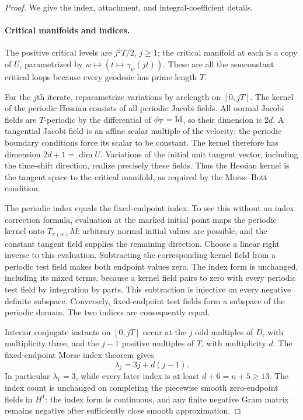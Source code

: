 \begin{proof}
We give the index, attachment, and integral-coefficient details.

\paragraph{Critical manifolds and indices.}
The positive critical levels are $j^2T/2$, $j\ge1$; the critical
manifold at each is a copy of $U$, parametrized by
$w\mapsto(t\mapsto\gamma_w(jt))$.  These are all the nonconstant
critical loops because every geodesic has prime length $T$.

For the $j$th iterate, reparametrize variations by arclength on
$[0,jT]$.  The kernel of the periodic Hessian consists of all
periodic Jacobi fields.  All normal Jacobi fields are $T$-periodic
by the differential of $\phi_T=\mathrm{Id}$, so their dimension is $2d$.
A tangential Jacobi field is an affine scalar multiple of the
velocity; the periodic boundary conditions force its scalar to be
constant.  The kernel therefore has dimension $2d+1=\dim U$.
Variations of the initial unit tangent vector, including the
time-shift direction, realize precisely these fields.
Thus the Hessian kernel is the
tangent space to the critical manifold, as required by the
Morse--Bott condition.

The periodic index equals the fixed-endpoint index.  To see this
without an index correction formula, evaluation at the marked
initial point maps the periodic kernel onto $T_{\pi(w)}M$:
arbitrary normal initial values are possible, and the constant
tangent field supplies the remaining direction.  Choose a linear
right inverse to this evaluation.  Subtracting the corresponding
kernel field from a periodic test field makes both endpoint
values zero.  The index form is unchanged, including its mixed
terms, because a kernel field pairs to zero with every periodic
test field by integration by parts.  This subtraction is injective
on every negative definite subspace.  Conversely, fixed-endpoint
test fields form a subspace of the periodic domain.  The two
indices are consequently equal.

Interior conjugate instants on $[0,jT]$ occur at the $j$ odd
multiples of $D$, with multiplicity three, and the $j-1$ positive
multiples of $T$, with multiplicity $d$.  The fixed-endpoint Morse
index theorem \citep[Theorem~15.1, p.~83]{Milnor1963} gives
\begin{equation}\label{geo:iterate-index}
 \lambda_j=3j+d(j-1).
\end{equation}
In particular $\lambda_1=3$, while every later index is at least
$d+6=n+5\ge13$. The index count is unchanged on completing the
piecewise smooth zero-endpoint fields in $H^1$: the index form
is continuous, and any finite negative Gram matrix remains
negative after sufficiently close smooth approximation.


\end{proof}
